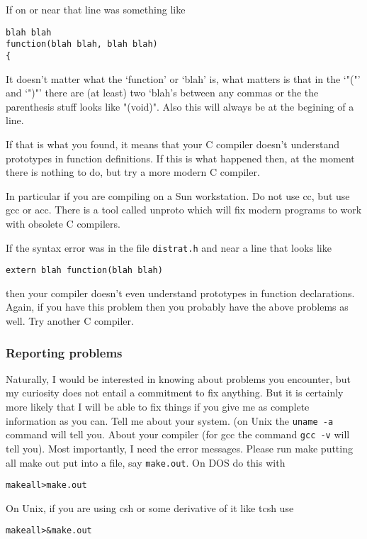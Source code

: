 \documentclass[%
	11pt,
        a4paper,
        twoside]{workrep}
\newcommand*{\prg}[1]{\textsf{#1}}		%
\newcommand*{\cmd}[1]{\texttt{#1}}		%
\newcommand*{\file}[1]{\texttt{#1}}		%
\begin{document}
\begin{itemize}
    If on or near that line was something like
\begin{verbatim}
blah blah
function(blah blah, blah blah)
{
\end{verbatim}
    It doesn't matter what the `function' or `blah' is, what matters
    is that in the `"("' and `")"' there are (at least) two `blah's between
    any commas or the the parenthesis stuff looks like "(void)".  Also
    this will always be at the begining of a line.

    If that is what you found, it means that your C compiler doesn't
    understand prototypes in function definitions.  If this is what
    happened then, at the moment there is nothing to do, but try a
    more modern C compiler.

    In particular if you are compiling on a Sun workstation.  Do not
    use \prg{cc}, but use \prg{gcc} or \prg{acc}.  There is a tool called
    \prg{unproto} which will fix modern programs
    to work with obsolete C compilers.

    If the syntax error was in the file \file{distrat.h} and near a line that
    looks like
\begin{verbatim}
extern blah function(blah blah)
\end{verbatim}
    then your compiler doesn't even understand prototypes in function
    declarations.  Again, if you have this problem then you probably have
    the above problems as well.  Try another C compiler.
\end{itemize}

\subsubsection{Reporting problems}

Naturally, I would be interested in knowing about problems you
encounter, but my curiosity does not entail a commitment to
fix anything.  But it is certainly more likely that I will be
able to fix things if you give me as complete information as
you can.  Tell me about your system. (on Unix the \cmd{uname -a}
command will tell you.  About your compiler (for gcc the command
\cmd{gcc -v} will tell you).  Most importantly, I need the error
messages.  Please run make putting all make out put into
a file, say \file{make.out}.  On DOS do this with
\begin{alltt}
 make all > make.out
\end{alltt}

On Unix, if you are using \prg{csh} or some derivative of it like \prg{tcsh}
use
\begin{alltt}
  make all >& make.out
\end{alltt}
\end{document}
